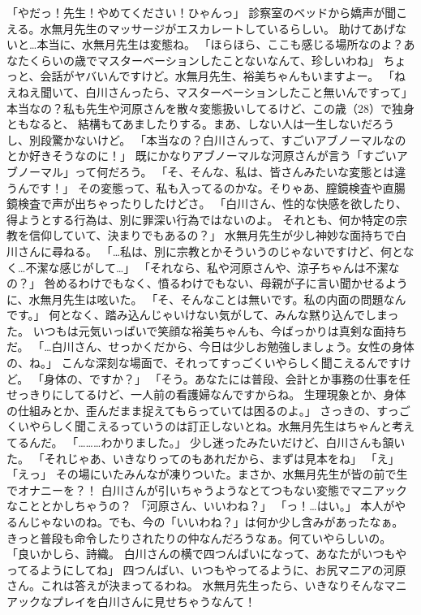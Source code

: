 「やだっ！先生！やめてください！ひゃんっ」
診察室のベッドから嬌声が聞こえる。水無月先生のマッサージがエスカレートしているらしい。
助けてあげないと…本当に、水無月先生は変態ね。
「ほらほら、ここも感じる場所なのよ？あなたくらいの歳でマスターベーションしたことないなんて、珍しいわね」
ちょっと、会話がヤバいんですけど。水無月先生、裕美ちゃんもいますよー。
「ねえねえ聞いて、白川さんったら、マスターベーションしたこと無いんですって」
本当なの？私も先生や河原さんを散々変態扱いしてるけど、この歳（28）で独身ともなると、
結構もてあましたりする。まあ、しない人は一生しないだろうし、別段驚かないけど。
「本当なの？白川さんって、すごいアブノーマルなのとか好きそうなのに！」
既にかなりアブノーマルな河原さんが言う「すごいアブノーマル」って何だろう。
「そ、そんな、私は、皆さんみたいな変態とは違うんです！」
その変態って、私も入ってるのかな。そりゃあ、膣鏡検査や直腸鏡検査で声が出ちゃったりしたけどさ。
「白川さん、性的な快感を欲したり、得ようとする行為は、別に罪深い行為ではないのよ。
それとも、何か特定の宗教を信仰していて、決まりでもあるの？」
水無月先生が少し神妙な面持ちで白川さんに尋ねる。
「…私は、別に宗教とかそういうのじゃないですけど、何となく…不潔な感じがして…」
「それなら、私や河原さんや、涼子ちゃんは不潔なの？」
咎めるわけでもなく、憤るわけでもない、母親が子に言い聞かせるように、水無月先生は呟いた。
「そ、そんなことは無いです。私の内面の問題なんです。」
何となく、踏み込んじゃいけない気がして、みんな黙り込んでしまった。
いつもは元気いっぱいで笑顔な裕美ちゃんも、今ばっかりは真剣な面持ちだ。
「…白川さん、せっかくだから、今日は少しお勉強しましょう。女性の身体の、ね。」
こんな深刻な場面で、それってすっごくいやらしく聞こえるんですけど。
「身体の、ですか？」
「そう。あなたには普段、会計とか事務の仕事を任せっきりにしてるけど、一人前の看護婦なんですからね。
生理現象とか、身体の仕組みとか、歪んだまま捉えてもらっていては困るのよ。」
さっきの、すっごくいやらしく聞こえるっていうのは訂正しないとね。水無月先生はちゃんと考えてるんだ。
「………わかりました。」
少し迷ったみたいだけど、白川さんも頷いた。
「それじゃあ、いきなりってのもあれだから、まずは見本をね」
「え」
「えっ」
その場にいたみんなが凍りついた。まさか、水無月先生が皆の前で生でオナニーを？！
白川さんが引いちゃうようなとてつもない変態でマニアックなこととかしちゃうの？
「河原さん、いいわね？」
「っ！…はい。」
本人がやるんじゃないのね。でも、今の「いいわね？」は何か少し含みがあったなぁ。
きっと普段も命令したりされたりの仲なんだろうなぁ。何ていやらしいの。
「良いかしら、詩織。 白川さんの横で四つんばいになって、あなたがいつもやってるようにしてね」
四つんばい、いつもやってるように、お尻マニアの河原さん。これは答えが決まってるわね。
水無月先生ったら、いきなりそんなマニアックなプレイを白川さんに見せちゃうなんて！

